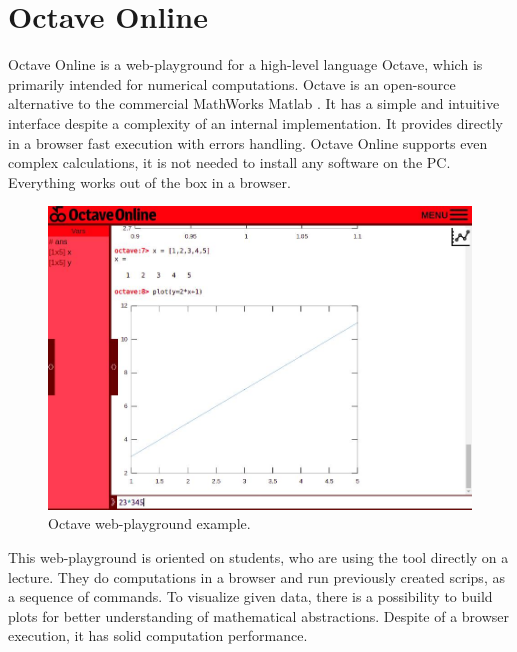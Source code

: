 \section{Octave Online} \label{sec:octave}
Octave Online \cite{Octave, nagar2018interactive} is a web-playground for a high-level language Octave, which is primarily intended for numerical computations. Octave is an open-source alternative to the commercial MathWorks Matlab \cite{Matlab}. It has a simple and intuitive interface despite a complexity of an internal implementation. It provides directly in a browser fast execution with errors handling. Octave Online supports even complex calculations, it is not needed to install any software on the PC. Everything works out of the box in a browser.
\begin{figure}[h!]
    \centering
    \includegraphics[width=0.7\linewidth]{src/pic/octave}
    \caption{Octave web-playground example.}
    \label{fig:octave}
\end{figure}
This web-playground is oriented on students, who are using the tool directly on a lecture. They do computations in a browser and run previously created scrips, as a sequence of commands. To visualize given data, there is a possibility to build plots for better understanding of mathematical abstractions. Despite of a browser execution, it has solid computation performance.

